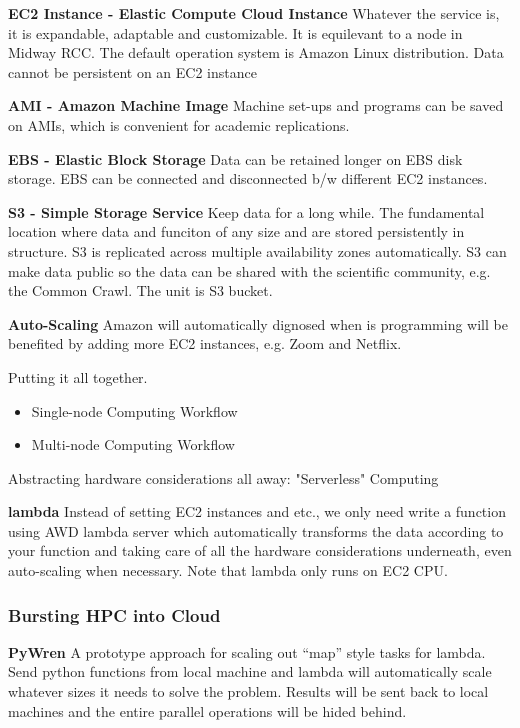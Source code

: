 \documentclass{article}
\begin{document}
\textbf{EC2 Instance - Elastic Compute Cloud Instance} Whatever the service is, it is expandable, adaptable and customizable. It is equilevant to a node in Midway RCC. The default operation system is Amazon Linux distribution. Data cannot be persistent on an EC2 instance

\textbf{AMI - Amazon Machine Image} Machine set-ups and programs can be saved on AMIs, which is convenient for academic replications.

\textbf{EBS - Elastic Block Storage} Data can be retained longer on EBS disk storage. EBS can be connected and disconnected b/w different EC2 instances.

\textbf{S3 - Simple Storage Service} Keep data for a long while. The fundamental location where data and funciton of any size and are stored persistently in structure. S3 is replicated across multiple availability zones automatically. S3 can make data public so the data can be shared with the scientific community, e.g. the Common Crawl. The unit is S3 bucket.

\textbf{Auto-Scaling} Amazon will automatically dignosed when is programming will be benefited by adding more EC2 instances, e.g. Zoom and Netflix.

Putting it all together.

\begin{itemize}
    \item Single-node Computing Workflow
    \item Multi-node Computing Workflow
\end{itemize}

Abstracting hardware considerations all away: "Serverless" Computing

\textbf{lambda} Instead of setting EC2 instances and etc., we only need write a function using AWD lambda server which automatically transforms the data according to your function and taking care of all the hardware considerations underneath, even auto-scaling when necessary. Note that lambda only runs on EC2 CPU.

\subsubsection{Bursting HPC into Cloud}

\textbf{PyWren} A prototype approach for scaling out ``map'' style tasks for lambda. Send python functions from local machine and lambda will automatically scale whatever sizes it needs to solve the problem. Results will be sent back to local machines and the entire parallel operations will be hided behind.
\end{document}
